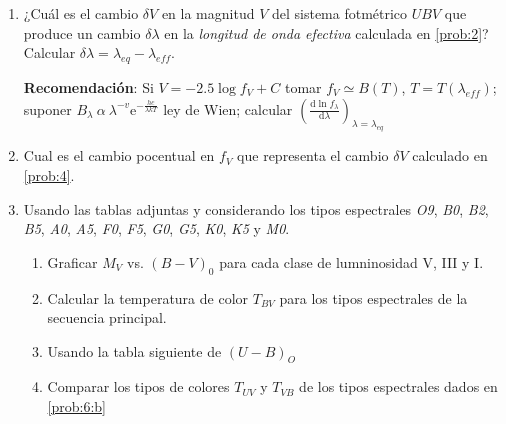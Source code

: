 \documentclass[10pt, spanish , a4paper, 1p]{elsarticle}
\begin{document}
\begin{enumerate}[wide, labelwidth=!, labelindent=0pt, label=\textbf{\textrm{\arabic*)}}, ref=\arabic*]

    \item \label{prob:4} ¿Cuál es el cambio $\delta V$ en la magnitud $V$ del sistema fotmétrico $UBV$ que produce un cambio $\delta\lambda$ en la \emph{longitud de onda efectiva} calculada en \ref{prob:2}? Calcular $\delta\lambda = {\lambda}_{eq} - {\lambda}_{eff}$.

    \textbf{Recomendación}:
    Si $V = -2.5 \log f_V + C$ tomar $f_V \simeq B\left(T\right) $, $T=T\left({\lambda}_{eff}\right)$; suponer $B_{\lambda}\ \alpha\ {\lambda}^{-v} \mathrm{e}^{-\frac{hc}{\lambda k T}}$ ley de Wien; calcular $\left(\frac{\mathrm{d} \ln {f}_{\lambda}}{\mathrm{d}\lambda}\right)_{\lambda = {\lambda}_{eq}}$

    \item \label{prob:5} Cual es el cambio pocentual en $f_V$ que representa el cambio $\delta V$ calculado en \ref{prob:4}.

    \item \label{prob:6} Usando las tablas adjuntas y considerando los tipos espectrales \emph{O9},
    \emph{B0}, \emph{B2}, \emph{B5}, \emph{A0}, \emph{A5}, \emph{F0}, \emph{F5}, \emph{G0}, \emph{G5}, \emph{K0}, \emph{K5} y \emph{M0}.

      \begin{enumerate}
        \item Graficar $M_V$ vs. $\left(B-V\right)_{0}$ para cada clase de lumninosidad V, III y I.

        \item \label{prob:6:a} Calcular la temperatura de color $T_{BV}$ para los tipos espectrales de la secuencia principal.

        \item \label{prob:6:b} Usando la tabla siguiente de  $\left(U-B\right)_O$

        \item \label{prob:6:c} Comparar los tipos de colores $T_{UV}$ y $T_{VB}$ de los tipos espectrales dados en \ref{prob:6:b}
      \end{enumerate}
  \end{enumerate}
\end{document}
